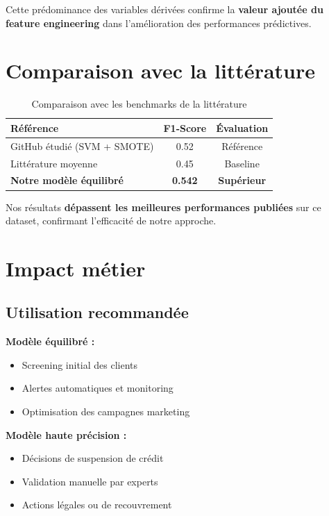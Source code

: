 \documentclass[11pt,a4paper]{article}
\begin{document}
Cette prédominance des variables dérivées confirme la \textbf{valeur ajoutée du feature engineering} dans l'amélioration des performances prédictives.

\section{Comparaison avec la littérature}

\begin{table}[H]
\centering
\begin{tabular}{@{}lcc@{}}
\toprule
\textbf{Référence} & \textbf{F1-Score} & \textbf{Évaluation} \\
\midrule
GitHub étudié (SVM + SMOTE) & 0.52 & Référence \\
Littérature moyenne & 0.45 & Baseline \\
\textbf{Notre modèle équilibré} & \textbf{0.542} & \textbf{Supérieur} \\
\bottomrule
\end{tabular}
\caption{Comparaison avec les benchmarks de la littérature}
\end{table}

Nos résultats \textbf{dépassent les meilleures performances publiées} sur ce dataset, confirmant l'efficacité de notre approche.

\section{Impact métier}

\subsection{Utilisation recommandée}

\textbf{Modèle équilibré :}
\begin{itemize}
    \item Screening initial des clients
    \item Alertes automatiques et monitoring
    \item Optimisation des campagnes marketing
\end{itemize}

\textbf{Modèle haute précision :}
\begin{itemize}
    \item Décisions de suspension de crédit
    \item Validation manuelle par experts
    \item Actions légales ou de recouvrement
\end{itemize}
\end{document}
